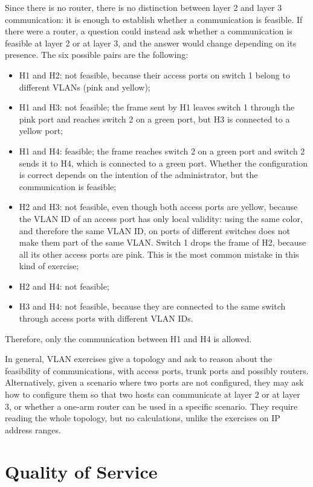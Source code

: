 \documentclass[11pt,a4paper,openany]{report}
\begin{document}
Since there is no router, there is no distinction between layer 2 and layer 3 communication: it is enough to establish whether a communication is feasible. If there were a router, a question could instead ask whether a communication is feasible at layer 2 or at layer 3, and the answer would change depending on its presence. The six possible pairs are the following:
\begin{itemize}
	\item H1 and H2: not feasible, because their access ports on switch 1 belong to different VLANs (pink and yellow);
	\item H1 and H3: not feasible; the frame sent by H1 leaves switch 1 through the pink port and reaches switch 2 on a green port, but H3 is connected to a yellow port;
	\item H1 and H4: feasible; the frame reaches switch 2 on a green port and switch 2 sends it to H4, which is connected to a green port. Whether the configuration is correct depends on the intention of the administrator, but the communication is feasible;
	\item H2 and H3: not feasible, even though both access ports are yellow, because the VLAN ID of an access port has only local validity: using the same color, and therefore the same VLAN ID, on ports of different switches does not make them part of the same VLAN. Switch 1 drops the frame of H2, because all its other access ports are pink. This is the most common mistake in this kind of exercise;
	\item H2 and H4: not feasible;
	\item H3 and H4: not feasible, because they are connected to the same switch through access ports with different VLAN IDs.
\end{itemize}
Therefore, only the communication between H1 and H4 is allowed.

In general, VLAN exercises give a topology and ask to reason about the feasibility of communications, with access ports, trunk ports and possibly routers. Alternatively, given a scenario where two ports are not configured, they may ask how to configure them so that two hosts can communicate at layer 2 or at layer 3, or whether a one-arm router can be used in a specific scenario. They require reading the whole topology, but no calculations, unlike the exercises on IP address ranges.


\chapter{Quality of Service}
\end{document}
